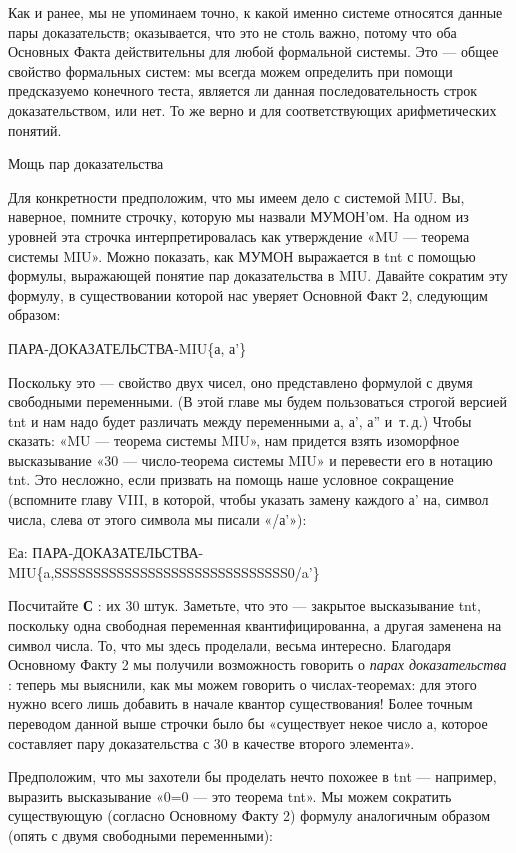 \documentclass[../main.tex]{subfiles}
\begin{document}
Как и ранее, мы не упоминаем точно, к какой именно системе относятся данные пары доказательств; оказывается, что это не столь важно, потому что оба Основных Факта действительны для любой формальной системы. Это --- общее свойство формальных систем: мы всегда можем определить при помощи предсказуемо конечного теста, является ли данная последовательность строк доказательством, или нет. То же верно и для соответствующих арифметических понятий.

Мощь пар доказательства

Для конкретности предположим, что мы имеем дело с системой MIU\@. Вы, наверное, помните строчку, которую мы назвали МУМОН'ом. На одном из уровней эта строчка интерпретировалась как утверждение «MU --- теорема системы MIU». Можно показать, как МУМОН выражается в \acs{tnt} с помощью формулы, выражающей понятие пар доказательства в MIU\@. Давайте сократим эту формулу, в существовании которой нас уверяет Основной Факт 2, следующим образом:

ПАРА-ДОКАЗАТЕЛЬСТВА-MIU\{а, а'\}

Поскольку это --- свойство двух чисел, оно представлено формулой с двумя свободными переменными. (В этой главе мы будем пользоваться строгой версией \acs{tnt} и нам надо будет различать между переменными а, а', а'' и~т.\,д.) Чтобы сказать: «MU --- теорема системы MIU», нам придется взять изоморфное высказывание «30 --- число-теорема системы MIU» и перевести его в нотацию \acs{tnt}\@. Это несложно, если призвать на помощь наше условное сокращение (вспомните главу VIII, в которой, чтобы указать замену каждого а' на, символ числа, слева от этого символа мы писали «/а'»):

Eа: ПАРА-ДОКАЗАТЕЛЬСТВА-MIU\{a,SSSSSSSSSSSSSSSSSSSSSSSSSSSSSS0/a'\}

Посчитайте \textbf{С} : их 30 штук. Заметьте, что это --- закрытое высказывание \acs{tnt}, поскольку одна свободная переменная квантифицированна, а другая заменена на символ числа. То, что мы здесь проделали, весьма интересно. Благодаря Основному Факту 2 мы получили возможность говорить о \emph{парах доказательства} : теперь мы выяснили, как мы можем говорить о числах-теоремах: для этого нужно всего лишь добавить в начале квантор существования! Более точным переводом данной выше строчки было бы «существует некое число а, которое составляет пару доказательства с 30 в качестве второго элемента».

Предположим, что мы захотели бы проделать нечто похожее в \acs{tnt} --- например, выразить высказывание «0=0 --- это теорема \acs{tnt}». Мы можем сократить существующую (согласно Основному Факту 2) формулу аналогичным образом (опять с двумя свободными переменными):
\end{document}
